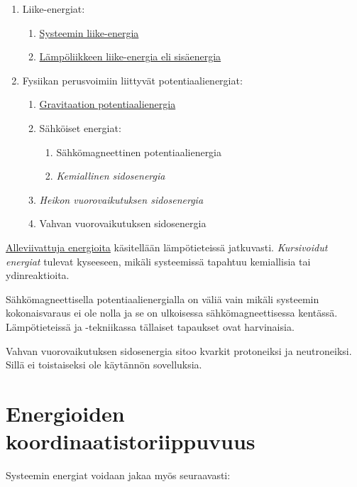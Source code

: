 \documentclass[12pt,a4paper,finnish]{book}
\begin{document}
\begin{enumerate}
 \item Liike-energiat:
 \begin{enumerate}
  \item \underline{Systeemin liike-energia}
  \item \underline{Lämpöliikkeen liike-energia eli sisäenergia}
 \end{enumerate}
 \item Fysiikan perusvoimiin liittyvät potentiaalienergiat:
 \begin{enumerate}
  \item \underline{Gravitaation potentiaalienergia}
  \item Sähköiset energiat:
  \begin{enumerate}
   \item Sähkömagneettinen potentiaalienergia
   \item \textit{Kemiallinen sidosenergia}
  \end{enumerate}
  \item \textit{Heikon vuorovaikutuksen sidosenergia}
  \item Vahvan vuorovaikutuksen sidosenergia
 \end{enumerate}
\end{enumerate}

\underline{Alleviivattuja energioita} käsitellään lämpötieteissä jatkuvasti. \textit{Kursivoidut 
energiat} tulevat kyseeseen, mikäli systeemissä tapahtuu kemiallisia tai ydinreaktioita. 

Sähkömagneettisella potentiaalienergialla on väliä vain mikäli systeemin kokonaisvaraus ei ole nolla ja 
se on ulkoisessa sähkömagneettisessa kentässä. Lämpötieteissä ja -tekniikassa tällaiset tapaukset ovat 
harvinaisia.

Vahvan vuorovaikutuksen sidosenergia sitoo kvarkit protoneiksi ja neutroneiksi. Sillä ei toistaiseksi 
ole käytännön sovelluksia.

\section{Energioiden koordinaatistoriippuvuus}

Systeemin energiat voidaan jakaa myös seuraavasti:
\end{document}
